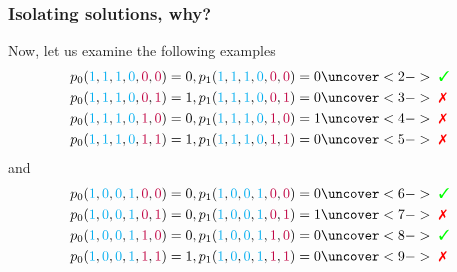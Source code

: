 \documentclass{beamer}
\newcommand{\cmark}{\ding{51}}%
\newcommand{\xmark}{\ding{55}}%
\begin{document}
\begin{frame}
    \frametitle{Isolating solutions, why?}
    Now, let us examine the following examples
    \begin{equation*}
        \begin{split}
            &p_0({\color{cyan}1}, {\color{cyan}1}, {\color{cyan}1}, {\color{cyan}0}, {\color{purple}0}, {\color{purple}0}) = 0, p_1({\color{cyan}1}, {\color{cyan}1}, {\color{cyan}1}, {\color{cyan}0}, {\color{purple}0}, {\color{purple}0}) = 0 \uncover<2->{\text{ \color{green}\cmark}}\\
            &p_0({\color{cyan}1}, {\color{cyan}1}, {\color{cyan}1}, {\color{cyan}0}, {\color{purple}0}, {\color{purple}1}) = 1, p_1({\color{cyan}1}, {\color{cyan}1}, {\color{cyan}1}, {\color{cyan}0}, {\color{purple}0}, {\color{purple}1}) = 0 \uncover<3->{\text{ \color{red}\xmark}}\\
            &p_0({\color{cyan}1}, {\color{cyan}1}, {\color{cyan}1}, {\color{cyan}0}, {\color{purple}1}, {\color{purple}0}) = 0, p_1({\color{cyan}1}, {\color{cyan}1}, {\color{cyan}1}, {\color{cyan}0}, {\color{purple}1}, {\color{purple}0}) = 1 \uncover<4->{\text{ \color{red}\xmark}}\\
            &p_0({\color{cyan}1}, {\color{cyan}1}, {\color{cyan}1}, {\color{cyan}0}, {\color{purple}1}, {\color{purple}1}) = 1, p_1({\color{cyan}1}, {\color{cyan}1}, {\color{cyan}1}, {\color{cyan}0}, {\color{purple}1}, {\color{purple}1}) = 0 \uncover<5->{\text{ \color{red}\xmark}}
        \end{split}
    \end{equation*}
    and 
    \begin{equation*}
        \begin{split}
            &p_0({\color{cyan}1}, {\color{cyan}0}, {\color{cyan}0}, {\color{cyan}1}, {\color{purple}0}, {\color{purple}0}) = 0, p_1({\color{cyan}1}, {\color{cyan}0}, {\color{cyan}0}, {\color{cyan}1}, {\color{purple}0}, {\color{purple}0}) = 0 \uncover<6->{\text{ \color{green}\cmark}}\\
            &p_0({\color{cyan}1}, {\color{cyan}0}, {\color{cyan}0}, {\color{cyan}1}, {\color{purple}0}, {\color{purple}1}) = 0, p_1({\color{cyan}1}, {\color{cyan}0}, {\color{cyan}0}, {\color{cyan}1}, {\color{purple}0}, {\color{purple}1}) = 1 \uncover<7->{\text{ \color{red}\xmark}}\\
            &p_0({\color{cyan}1}, {\color{cyan}0}, {\color{cyan}0}, {\color{cyan}1}, {\color{purple}1}, {\color{purple}0}) = 0, p_1({\color{cyan}1}, {\color{cyan}0}, {\color{cyan}0}, {\color{cyan}1}, {\color{purple}1}, {\color{purple}0}) = 0 \uncover<8->{\text{ \color{green}\cmark}}\\
            &p_0({\color{cyan}1}, {\color{cyan}0}, {\color{cyan}0}, {\color{cyan}1}, {\color{purple}1}, {\color{purple}1}) = 1, p_1({\color{cyan}1}, {\color{cyan}0}, {\color{cyan}0}, {\color{cyan}1}, {\color{purple}1}, {\color{purple}1}) = 0 \uncover<9->{\text{ \color{red}\xmark}}
        \end{split}
    \end{equation*}
\end{frame}
\end{document}
